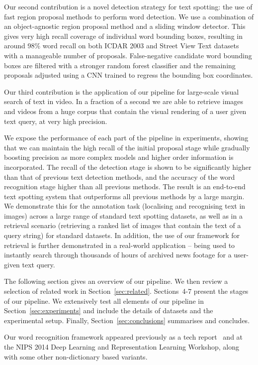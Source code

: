 \documentclass[twocolumn]{svjour3}          \smartqed  \usepackage{epsfig}
\begin{document}
Our second contribution is a novel detection strategy for text spotting: the use of fast region proposal methods to perform word detection. We use a combination of an object-agnostic region proposal method and a sliding window detector. This gives very high recall coverage of individual word bounding boxes, resulting in around 98\% word recall on both ICDAR 2003 and Street View Text datasets with a manageable number of proposals. False-negative candidate word bounding boxes are filtered with a stronger random forest classifier and the remaining proposals adjusted using a CNN trained to regress the bounding box coordinates.

Our third contribution is the application of our pipeline for large-scale visual search of text in video. In a fraction of a second we are able to retrieve images and videos from a huge corpus that contain the visual rendering of a user given text query, at very high precision.

We expose the performance of each part of the pipeline in experiments, showing that we can maintain the high recall of the initial proposal stage while gradually boosting precision as more complex models and higher order information is incorporated. The recall of the detection stage is shown to be significantly higher than that of previous text detection methods, and the accuracy of the word recognition stage higher than all previous methods. The result is an end-to-end text spotting system that outperforms all previous methods by a large margin. We demonstrate this for the annotation task (localising and recognising text in images) across a large range of standard text spotting datasets, as well as in a retrieval scenario (retrieving a ranked list of images that contain the text of a query string) for standard datasets. In addition, the use of our framework for retrieval is further demonstrated in a real-world application -- being used to instantly search through thousands of hours of archived news footage for a user-given text query.

The following section gives an overview of our pipeline. We then review a selection of related work in Section~\ref{sec:related}. Sections~4-7 present the stages of our pipeline. We extensively test all elements of our pipeline in Section~\ref{sec:experiments} and include the details of datasets and the experimental setup. Finally, Section~\ref{sec:conclusions} summarises and concludes.

Our word recognition framework appeared previously as a tech report~\cite{Jaderberg14c} and at the NIPS 2014 Deep Learning and Representation Learning Workshop, along with some other non-dictionary based variants.
\end{document}
